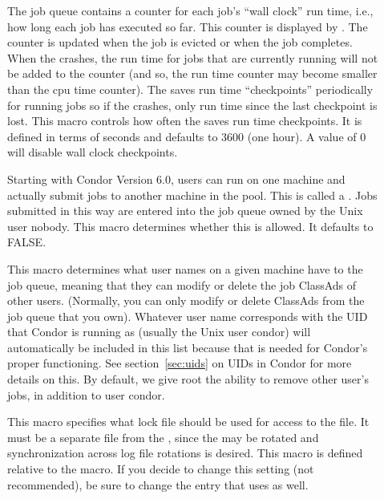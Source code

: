\begin{description}
\item[] \label{param:WallClockCkptInterval}
  The job queue contains a counter for each job's ``wall clock'' run
  time, i.e., how long each job has executed so far.  This counter is
  displayed by .  The counter is updated when the job is
  evicted or when the job completes.  When the  crashes, the run
  time for jobs that are currently running will not be added to the
  counter (and so, the run time counter may become smaller than the
  cpu time counter).  The  saves run time ``checkpoints''
  periodically for running jobs so if the  crashes, only run
  time since the last checkpoint is lost.  This macro controls how
  often the  saves run time checkpoints.  It is defined in terms
  of seconds and defaults to 3600 (one hour).  A value of 0 will
  disable wall clock checkpoints.

\item[] \label{param:AllowRemoteSubmit}
  Starting with Condor Version 6.0, users can run  on
  one machine and actually submit jobs to another machine in the
  pool.  This is called a .  Jobs submitted in
  this way are entered into the job queue owned by the Unix user
  nobody.
  This macro determines whether this is allowed.
  It defaults to FALSE.
     
\item[] \label{param:QueueSuperUsers} This
  macro determines what user names on a given machine have
   to the job queue, meaning that they can
  modify or delete the job ClassAds of other users.  (Normally, you
  can only modify or delete ClassAds from the job queue that you own).
  Whatever user name corresponds with the UID that Condor is running as
  (usually the Unix user condor) will automatically be included in this list
  because that is needed for Condor's proper functioning.  See
  section~\ref{sec:uids} on UIDs in Condor for more details on
  this.  By default, we give root the ability to remove other
  user's jobs, in addition to user condor.
      
\item[] \label{param:ScheddLock} This macro
  specifies what lock file should be used for access to the
   file.  It must be a separate file from the
  , since the  may be rotated and
  synchronization across log file rotations
  is desired.
  This macro is defined relative to the  macro.
  If you decide to change this setting (not recommended),
  be sure to change the  entry that
   uses as well.


\end{description}
